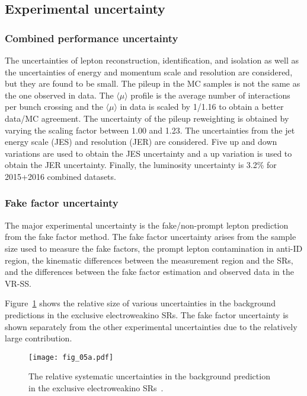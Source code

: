 
\subsection{Experimental uncertainty}
\label{subsec:bkg_experimental_uncertainty}


\subsubsection{Combined performance uncertainty}
\label{subsubsec:bkg_combined_performance uncertainty}
The uncertainties of lepton reconstruction, identification, and isolation as well as the uncertainties of energy and momentum scale and resolution are considered, but they are found to be small.
The pileup in the MC samples is not the same as the one observed in data.
The $\langle \mu \rangle$ profile is the average number of interactions per bunch crossing and the $\langle \mu \rangle$ in data is scaled by 1/1.16 to obtain a better data/MC agreement.
The uncertainty of the pileup reweighting is obtained by varying the scaling factor between 1.00 and 1.23.
The uncertainties from the jet energy scale (JES) and resolution (JER) are considered.
Five up and down variations are used to obtain the JES uncertainty and a up variation is used to obtain the JER uncertainty.
Finally, the luminosity uncertainty is 3.2\% for 2015+2016 combined datasets.


\subsubsection{Fake factor uncertainty}
\label{subsubsec:bkg_fake_factor_uncertainty}
The major experimental uncertainty is the fake/non-prompt lepton prediction from the fake factor method.
The fake factor uncertainty arises from the sample size used to measure the fake factors, the prompt lepton contamination in anti-ID region, the kinematic differences between the measurement region and the SRs, and the differences between the fake factor estimation and observed data in the VR-SS.

Figure~\ref{fig:bkg_relative_systematic_uncertainties} shows the relative size of various uncertainties in the background predictions in the exclusive electroweakino SRs.
The fake factor uncertainty is shown separately from the other experimental uncertainties due to the relatively large contribution.

\begin{figure}[htbp]
    \begin{center}
        \texttt{[image: fig\_05a.pdf]}
        \caption{The relative systematic uncertainties in the background prediction in the exclusive electroweakino SRs~\cite{Aaboud:2017leg}.}
        \label{fig:bkg_relative_systematic_uncertainties}
    \end{center}
\end{figure}
